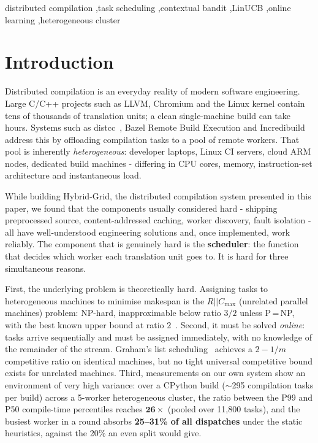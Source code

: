 \documentclass[final,5p,times,twocolumn]{elsarticle}
\begin{document}
\begin{frontmatter}
\begin{abstract}
scheduling study can check whether it is really measuring scheduling at all.
\end{abstract}

\begin{keyword}
distributed compilation \sep task scheduling \sep contextual bandit \sep LinUCB \sep online learning \sep heterogeneous cluster
\end{keyword}

\end{frontmatter}

\section{Introduction}
\label{sec:intro}

Distributed compilation is an everyday reality of modern software engineering. Large C/C++ projects such as LLVM, Chromium and the Linux kernel contain tens of thousands of translation units; a clean single-machine build can take hours. Systems such as distcc~\cite{distcc}, Bazel Remote Build Execution and Incredibuild address this by offloading compilation tasks to a pool of remote workers. That pool is inherently \emph{heterogeneous}: developer laptops, Linux CI servers, cloud ARM nodes, dedicated build machines - differing in CPU cores, memory, instruction-set architecture and instantaneous load.

While building Hybrid-Grid, the distributed compilation system presented in this paper, we found that the components usually considered hard - shipping preprocessed source, content-addressed caching, worker discovery, fault isolation - all have well-understood engineering solutions and, once implemented, work reliably. The component that is genuinely hard is the \textbf{scheduler}: the function that decides which worker each translation unit goes to. It is hard for three simultaneous reasons.

First, the underlying problem is theoretically hard. Assigning tasks to heterogeneous machines to minimise makespan is the $R||C_{\max}$ (unrelated parallel machines) problem: NP-hard, inapproximable below ratio $3/2$ unless P{\,=\,}NP, with the best known upper bound at ratio $2$~\cite{lenstra1990}. Second, it must be solved \emph{online}: tasks arrive sequentially and must be assigned immediately, with no knowledge of the remainder of the stream. Graham's list scheduling~\cite{graham1969} achieves a $2-1/m$ competitive ratio on identical machines, but no tight universal competitive bound exists for unrelated machines. Third, measurements on our own system show an environment of very high variance: over a CPython build ($\sim$295 compilation tasks per build) across a 5-worker heterogeneous cluster, the ratio between the P99 and P50 compile-time percentiles reaches $\mathbf{26\times}$ (pooled over 11{,}800 tasks), and the busiest worker in a round absorbs \textbf{25--31\% of all dispatches} under the static heuristics, against the 20\% an even split would give.
\end{document}
